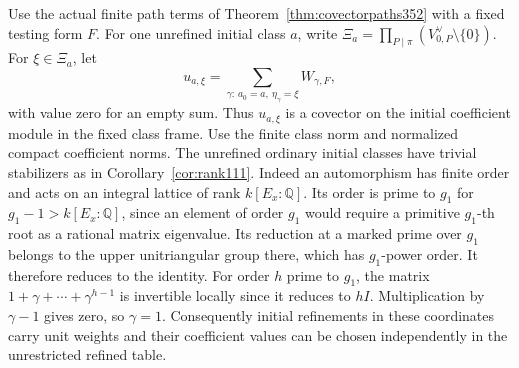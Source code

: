 \documentclass[a4paper,11pt]{article}
\theoremstyle{definition}
\theoremstyle{remark}
\numberwithin{equation}{section}
\begin{document}
Use the actual finite path terms of Theorem~\ref{thm:covectorpaths352}
with a fixed testing form \(F\). For one unrefined initial class \(a\),
write \(\Xi_a=\prod_{P\mid\pi}(V_{0,P}^\vee\setminus\{0\})\). For
\(\xi\in\Xi_a\), let
\[
              u_{a,\xi}=
                 \sum_{\gamma:\,a_0=a,\ \eta_\gamma=\xi} W_{\gamma,F},
\]
with value zero for an empty sum. Thus \(u_{a,\xi}\) is a covector
on the initial coefficient module in the fixed class frame.
Use the finite class norm and normalized compact coefficient norms.
The unrefined ordinary initial classes have trivial stabilizers as in
Corollary~\ref{cor:rank111}. Indeed an automorphism has finite order
and acts on an integral lattice of rank \(k[E_x:\mathbb Q]\).
Its order is prime to \(g_1\) for \(g_1-1>k[E_x:\mathbb Q]\),
since an element of order \(g_1\) would require a primitive
\(g_1\)-th root as a rational matrix eigenvalue. Its reduction
at a marked prime over \(g_1\) belongs to the upper unitriangular
group there, which has \(g_1\)-power order. It therefore reduces to
the identity. For order \(h\) prime to \(g_1\), the matrix
\(1+\gamma+\cdots+\gamma^{h-1}\) is invertible locally since it
reduces to \(hI\). Multiplication by \(\gamma-1\) gives zero,
so \(\gamma=1\). Consequently initial refinements in these
coordinates carry unit weights and their coefficient values can be
chosen independently in the unrestricted refined table.
\end{document}
